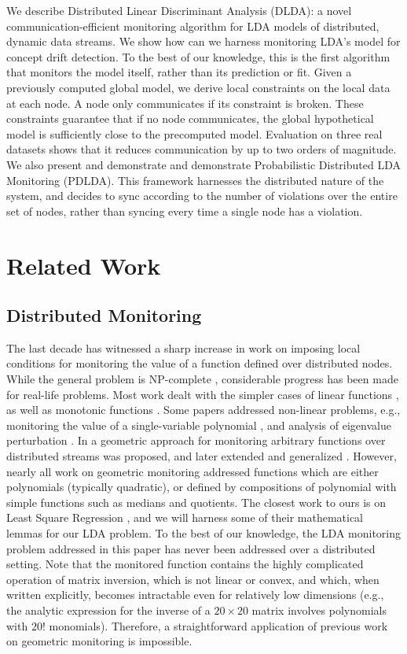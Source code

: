 \documentclass[11pt,twocolumn,varwidth=true,a4paper,fleqn]{article}
\begin{document}
We describe Distributed Linear Discriminant Analysis (DLDA): a novel
communication-efficient monitoring algorithm for LDA models of distributed, dynamic data streams.
We show how can we harness monitoring LDA's model for concept drift detection. 
To the best of our knowledge, this is the first algorithm that monitors the
model itself, rather than its prediction or fit. Given a previously computed
global model, we derive local constraints on the local data at each node. A node only communicates
if its constraint is broken. These constraints guarantee that
if no node communicates, the global hypothetical model is
sufficiently close to the precomputed model.
Evaluation on three real datasets shows that it reduces communication by up to
two orders of magnitude. 
We also present and demonstrate and demonstrate 
Probabilistic Distributed LDA Monitoring (PDLDA). This framework harnesses the 
distributed nature of the system, and decides to sync according 
to the number of violations over the entire set of nodes, rather than syncing every
time a single node has a violation.

\section{Related Work}
\subsection{Distributed Monitoring}
The last decade has witnessed a sharp increase in work on imposing local
conditions for monitoring the value of a function defined over distributed nodes. While the general problem is NP-complete
\cite{keren2014geometric}, considerable progress has been made for real-life problems. Most work dealt with the simpler cases of
linear functions \cite{keralapura2006communication, kashyap2008efficient}, as well as monotonic
functions \cite{michel2005klee}.
Some papers addressed non-linear problems, e.g., monitoring
the value of a single-variable polynomial \cite{shah2008handling}, and analysis
of eigenvalue perturbation \cite{huang2007communication}. 
In \cite{sharfman2007geometric} a geometric approach for monitoring arbitrary functions over distributed
streams was proposed, and later extended and generalized
\cite{keren2012shape,lazerson2015monitoring}. However, nearly all work on geometric monitoring addressed
functions which are either polynomials (typically quadratic), or defined by
compositions of polynomial with simple functions such as medians and quotients. 
The closest work to ours is on Least Square Regression
\cite{gabel2015monitoring}, and we will harness some of their mathematical
lemmas for our LDA problem. To the best of our knowledge, the LDA monitoring
problem addressed in this paper has never been addressed over a distributed
setting.
Note that the monitored function contains the highly complicated
operation of matrix inversion, which is not linear or convex,
and which, when written explicitly, becomes intractable even
for relatively low dimensions (e.g., the analytic expression
for the inverse of a $20 \times 20$ matrix involves polynomials with
$20!$ monomials). Therefore, a straightforward application of
previous work on geometric monitoring is impossible.
\end{document}
